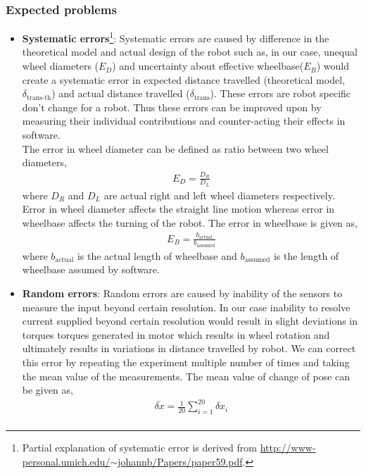 \documentclass[11pt,a4paper,openright,twoside]{extreport}
\begin{document}
\subsubsection*{Expected problems}
\begin{itemize}
\item \textbf{Systematic errors}\footnote{Partial explanation of systematic error is derived from \href{http://www-personal.umich.edu/~johannb/Papers/paper59.pdf}{http://www-personal.umich.edu/$\sim$johannb/Papers/paper59.pdf}.}: Systematic errors are caused by difference in the theoretical model and actual design of the robot such as, in our case, unequal wheel diameters ($E_D$) and uncertainty about effective wheelbase($E_B$) would create a systematic error in expected distance travelled (theoretical model, $\delta_{\text{trans-th}}$) and actual distance travelled ($\delta_{\text{trans}}$). These errors are robot specific don't change for a robot. Thus these errors can be improved upon by measuring their individual contributions and counter-acting their effects in software.\\
The error in wheel diameter can be defined as ratio between two wheel diameters,
\begin{align*}
E_D = \frac{D_R}{D_L}
\end{align*}
where $D_R$ and $D_L$ are actual right and left wheel diameters respectively. Error in wheel diameter affects the straight line motion whereas error in wheelbase affects the turning of the robot. The error in wheelbase is given as,
\begin{align*}
E_B = \frac{b_{\text{actual}}}{b_{\text{assumed}}}
\end{align*}
where $b_{\text{actual}}$ is the actual length of wheelbase and $b_{\text{assumed}}$ is the length of wheelbase assumed by software.
\item \textbf{Random errors}: Random errors are caused by inability of the sensors to measure the input beyond certain resolution. In our case inability to resolve current supplied beyond certain resolution would result in slight deviations in torques torques generated in motor which results in wheel rotation and ultimately results in variations in distance travelled by robot. We can correct this error by repeating the experiment multiple number of times and taking the mean value of the measurements. The mean value of change of pose can be given as,
\begin{align*}
\overline{\delta x} = \frac{1}{20} \sum_{i=1}^{20} \delta x_i \\

\end{align*}
\end{itemize}
\end{document}
